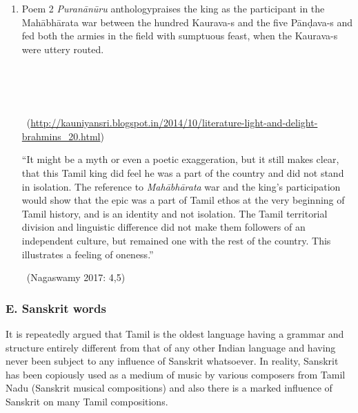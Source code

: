\begin{enumerate}[{\rm 1.}]
 \item 
 Poem 2 \textit{Puranānūru} anthologypraises the king as the participant in the Mahābhārata war between the hundred Kaurava-s and the five Pānḍava-s and fed both the armies in the field with sumptuous feast, when the Kaurava-s were uttery routed.

\begin{myquote}
\\\\\\

~\hfill (\url{http://kauniyansri.blogspot.in/2014/10/literature-light-and-delight-brahmins_20.html})
\end{myquote}

\begin{myquote}
“It might be a myth or even a poetic exaggeration, but it still makes clear, that this Tamil king did feel he was a part of the country and did not stand in isolation. The reference to \textit{Mahābhārata} war and the king’s participation would show that the epic was a part of Tamil ethos at the very beginning of Tamil history, and is an identity and not isolation. The Tamil territorial division and linguistic difference did not make them followers of an independent culture, but remained one with the rest of the country. This illustrates a feeling of oneness.”

~\hfill (Nagaswamy 2017: 4,5)
\end{myquote}


\end{enumerate}


\subsubsection*{E. Sanskrit words}

It is repeatedly argued that Tamil is the oldest language having a grammar and structure entirely different from that of any other Indian language and having never been subject to any influence of Sanskrit whatsoever. In reality, Sanskrit has been copiously used as a medium of music by various composers from Tamil Nadu (Sanskrit musical compositions) and also there is a marked influence of Sanskrit on many Tamil compositions.

